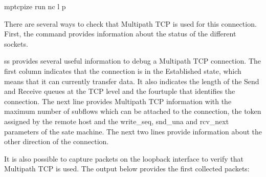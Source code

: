 \documentclass[letterpaper,10pt,english]{sphinxmanual}
\begin{document}
\begin{sphinxVerbatim}[commandchars=\\\{\}]
mptcpize run nc \PYGZhy{}l \PYGZhy{}p 
\end{sphinxVerbatim}

\sphinxAtStartPar
There are several ways to check that Multipath TCP is used for this connection. First, the  command provides information about the status of the different sockets.

\begin{sphinxVerbatim}[commandchars=\\\{\}]
\end{sphinxVerbatim}

\sphinxAtStartPar
ss provides several useful information to debug a Multipath TCP connection. The first column indicates that the connection is in the Established state, which means that it can currently transfer data. It also indicates the length of the Send and Receive queues at the TCP level and the four\sphinxhyphen{}tuple that identifies the connection. The next line provides Multipath TCP information with the maximum number of subflows which can be attached to the connection, the token assigned by the remote host and the write\_seq, snd\_una and rcv\_next parameters of the sate machine. The next two lines provide information about the other direction of the connection.

\sphinxAtStartPar
It is also possible to capture packets on the loopback interface to verify that Multipath TCP is used. The output below provides the first collected packets:
\end{document}
